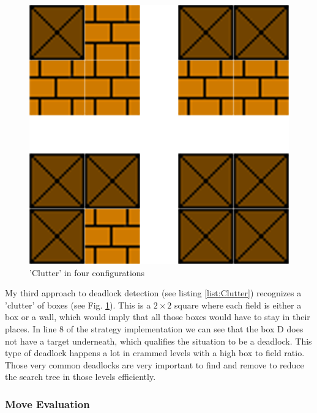 \documentclass[12pt,a4paper,oneside]{report}
\begin{document}

\begin{lstlisting}[caption={Clutter},label=list:Clutter]
\end{lstlisting}

\begin{figure}[ht]
\centering
\includegraphics[scale=0.2]{deadlocktypes}
\caption{'Clutter' in four configurations}
\label{fig:clutter}
\end{figure}

My third approach to deadlock detection (see listing \ref{list:Clutter}) recognizes a 'clutter' of boxes (see Fig. \ref{fig:clutter}). This is a $2 \times 2$ square where each field is either a box or a wall, which would imply that all those boxes would have to stay in their places. In line 8 of the strategy implementation we can see that the box D does not have a target underneath, which qualifies the situation to be a deadlock. This type of deadlock happens a lot in crammed levels with a high box to field ratio. Those very common deadlocks are very important to find and remove to reduce the search tree in those levels efficiently.
\\
\subsubsection{Move Evaluation}
\end{document}
